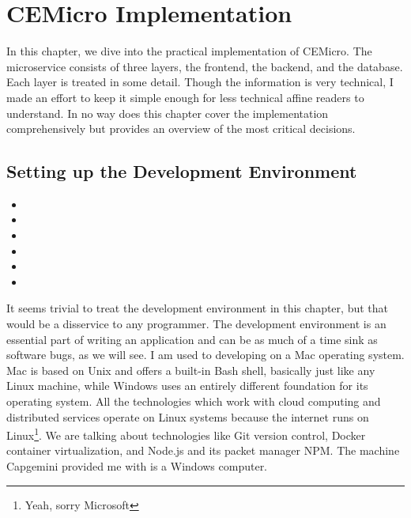 \chapter{CEMicro Implementation}
\label{sec:impl}

In this chapter, we dive into the practical implementation of CEMicro. The microservice consists of three layers, the frontend, the backend, and the database. Each layer is treated in some detail. Though the information is very technical, I made an effort to keep it simple enough for less technical affine readers to understand. In no way does this chapter cover the implementation comprehensively but provides an overview of the most critical decisions.


\section{Setting up the Development Environment}

\begin{itemize}
  \item {}
  \item {}
  \item {}
  \item {}
  \item {}
  \item {}
\end{itemize}

It seems trivial to treat the development environment in this chapter, but that would be a disservice to any programmer. The development environment is an essential part of writing an application and can be as much of a time sink as software bugs, as we will see. I am used to developing on a Mac operating system. Mac is based on Unix and offers a built-in Bash shell, basically just like any Linux machine, while Windows uses an entirely different foundation for its operating system. All the technologies which work with cloud computing and distributed services operate on Linux systems because the internet runs on Linux\footnote{Yeah, sorry Microsoft}. We are talking about technologies like Git version control, Docker container virtualization, and Node.js and its packet manager NPM. The machine Capgemini provided me with is a Windows computer.

